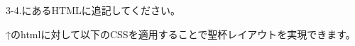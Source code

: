 3-4.にあるHTMLに追記してください。

\begin{Shaded}
\begin{Highlighting}[]
    \DataTypeTok{\textless{}/}\DataTypeTok{\textgreater{}}
    \DataTypeTok{\textless{}}\OperatorTok{=}\DataTypeTok{\textgreater{}} 
      \DataTypeTok{\textless{}}\OperatorTok{=}\DataTypeTok{\textgreater{}}
        \DataTypeTok{\textless{}}\DataTypeTok{\textgreater{}}\DataTypeTok{\textless{}/}\DataTypeTok{\textgreater{}}
      \DataTypeTok{\textless{}/}\DataTypeTok{\textgreater{}}
      \DataTypeTok{\textless{}}\DataTypeTok{\textgreater{}}
        \DataTypeTok{\textless{}}\DataTypeTok{\textgreater{}}\DataTypeTok{\textless{}/}\DataTypeTok{\textgreater{}}
      \DataTypeTok{\textless{}/}\DataTypeTok{\textgreater{}}
      \DataTypeTok{\textless{}}\OperatorTok{=}\DataTypeTok{\textgreater{}}
        \DataTypeTok{\textless{}}\DataTypeTok{\textgreater{}}\DataTypeTok{\textless{}/}\DataTypeTok{\textgreater{}}
      \DataTypeTok{\textless{}/}\DataTypeTok{\textgreater{}}
    \DataTypeTok{\textless{}/}\DataTypeTok{\textgreater{}} 
    \DataTypeTok{\textless{}}\DataTypeTok{\textgreater{}}
\end{Highlighting}
\end{Shaded}

↑のhtmlに対して以下のCSSを適用することで聖杯レイアウトを実現できます。

